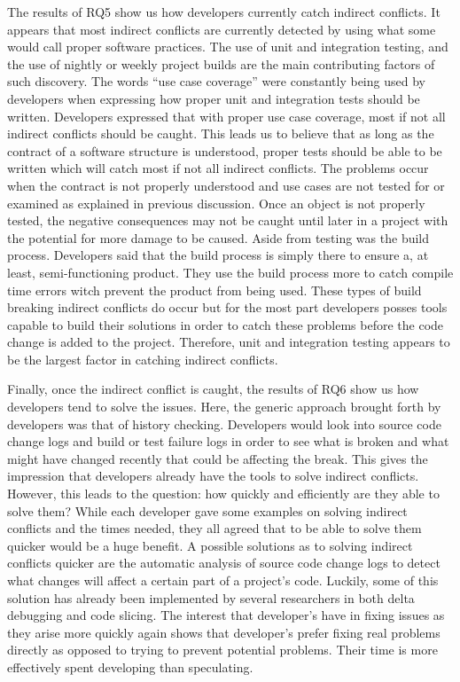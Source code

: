 \documentclass[conference]{IEEEtran}
\begin{document}
The results of RQ5 show us how developers currently catch indirect conflicts. It appears that most indirect conflicts are currently
detected by using what some would call proper software practices. The use of unit and integration testing, and the use of nightly or weekly
project builds are the main contributing factors of such discovery. The words ``use case coverage'' were constantly being used by developers
when expressing how proper unit and integration tests should be written. Developers expressed that with proper use case coverage, most if
not all indirect conflicts should be caught. This leads us to believe that as long as the contract of a software structure is understood,
proper tests should be able to be written which will catch most if not all indirect conflicts. The problems occur when the contract is
not properly understood and use cases are not tested for or examined as explained in previous discussion. Once an object is not properly
tested, the negative consequences may not be caught until later in a project with the potential for more damage to be caused. Aside from testing
was the build process. Developers said that the build process is simply there to ensure a, at least, semi-functioning product. They use
the build process more to catch compile time errors witch prevent the product from being used. These types of build breaking indirect
conflicts do occur but for the most part developers posses tools capable to build their solutions in order to catch these problems before
the code change is added to the project. Therefore, unit and integration testing appears to be the largest factor in catching indirect conflicts.

Finally, once the indirect conflict is caught, the results of RQ6 show us how developers tend to solve the issues. Here, the generic approach
brought forth by developers was that of history checking. Developers would look into source code change logs and build or test failure
logs in order to see what is broken and what might have changed recently that could be affecting the break. This gives the impression that
developers already have the tools to solve indirect conflicts. However, this leads to the question: how quickly and
efficiently are they able to solve them?
While each developer gave some examples on solving indirect conflicts and the times needed, they all agreed that to be able to solve them
quicker would be a huge benefit. A possible solutions as to solving indirect conflicts quicker are the automatic analysis of source code
change logs to detect what changes will affect a certain part of a project's code. Luckily, some of this solution has already been implemented
by several researchers in both delta debugging and code slicing. The interest that developer's have in fixing issues as they
arise more quickly again shows that developer's prefer fixing real problems directly as opposed to trying to prevent potential problems.
Their time is more effectively spent developing than speculating. 
\end{document}
